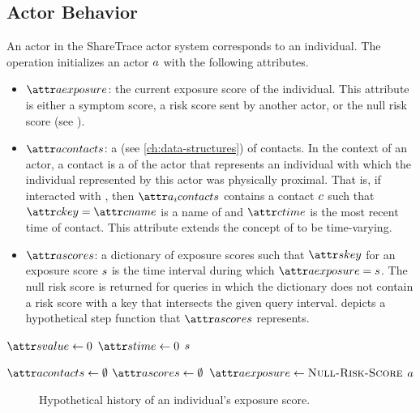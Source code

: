 \subsection{Actor Behavior}

An actor in the ShareTrace actor system corresponds to an individual. The \cCreateActor operation \citep{Agha1985} initializes an actor $a$ with the following attributes.
\begin{itemize}
  \item $\aActorExposure$: the current exposure score of the individual. This attribute is either a symptom score, a risk score sent by another actor, or the null risk score (see \cNullRiskScore).
  \item $\aActorContacts$: a  (see \cref{ch:data-structures}) of contacts. In the context of an actor, a contact is a  \citep{Gamma1995} of the actor that represents an individual with which the individual represented by this actor was physically proximal. That is, if  interacted with , then $\aContacts{\vActor_i}$ contains a contact $c$ such that $\aContactKey = \aContactName$ is a name of  and $\aContactTime$ is the most recent time of contact. This attribute extends the concept of  \citep{Hewitt1977a, Hewitt1977b, Agha1985} to be time-varying.
  \item $\aActorScores$: a dictionary of exposure scores such that $\aScoreKey$ for an exposure score $s$ is the time interval during which $\aActorExposure = \vScore$. The null risk score is returned for queries in which the dictionary does not contain a risk score with a key that intersects the given query interval.  depicts a hypothetical step function that $\aActorScores$ represents.
\end{itemize}

\begin{function}[H]{\nNullRiskScore}
  \State $\aScoreValue \assign 0$
  \State $\aScoreTime \assign 0$
  \State \Return $s$
\end{function}

\begin{function}[H]{\nCreateActor}
  \State $\aActorContacts \assign \emptyset$
  \State $\aActorScores \assign \emptyset$
  \State $\aActorExposure \assign \cNullRiskScore$
  \State \Return $a$
\end{function}

\begin{figure}[htbp]
\centering
{}
\caption[Historical exposure scores of an actor]{Hypothetical history of an individual's exposure score.}
\label{fig:exposure}
\end{figure}


